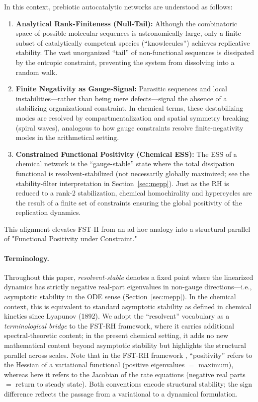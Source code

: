 \documentclass[12pt,a4paper]{article}
\theoremstyle{remark}
\begin{document}
In this context, prebiotic autocatalytic networks are understood as follows:
\begin{enumerate}[label=\alph*)]
    \item \textbf{Analytical Rank-Finiteness (Null-Tail):} Although the combinatoric space of possible molecular sequences is astronomically large, only a finite subset of catalytically competent species (``knowlecules'') achieves replicative stability. The vast unorganized ``tail'' of non-functional sequences is dissipated by the entropic constraint, preventing the system from dissolving into a random walk.
    \item \textbf{Finite Negativity as Gauge-Signal:} Parasitic sequences and local instabilities---rather than being mere defects---signal the absence of a stabilizing organizational constraint. In chemical terms, these destabilizing modes are resolved by compartmentalization and spatial symmetry breaking (spiral waves), analogous to how gauge constraints resolve finite-negativity modes in the arithmetical setting.
    \item \textbf{Constrained Functional Positivity (Chemical ESS):} The ESS of a chemical network is the ``gauge-stable'' state where the total dissipation functional is resolvent-stabilized (not necessarily globally maximized; see the stability-filter interpretation in Section~\ref{sec:mepp}). Just as the RH is reduced to a rank-2 stabilization, chemical homochirality and hypercycles are the result of a finite set of constraints ensuring the global positivity of the replication dynamics.
\end{enumerate}

This alignment elevates FST-II from an ad hoc analogy into a structural parallel of "Functional Positivity under Constraint."

\paragraph{Terminology.} Throughout this paper, \emph{resolvent-stable} denotes a fixed point where the linearized dynamics has strictly negative real-part eigenvalues in non-gauge directions---i.e., asymptotic stability in the ODE sense (Section~\ref{sec:mepp}). In the chemical context, this is equivalent to standard asymptotic stability as defined in chemical kinetics since Lyapunov (1892). We adopt the ``resolvent'' vocabulary as a \emph{terminological bridge} to the FST-RH framework, where it carries additional spectral-theoretic content; in the present chemical setting, it adds no new mathematical content beyond asymptotic stability but highlights the structural parallel across scales. Note that in the FST-RH framework \citep{GeigerRH2026b}, ``positivity'' refers to the Hessian of a variational functional (positive eigenvalues $=$ maximum), whereas here it refers to the Jacobian of the rate equations (negative real parts $=$ return to steady state). Both conventions encode structural stability; the sign difference reflects the passage from a variational to a dynamical formulation.
\end{document}
